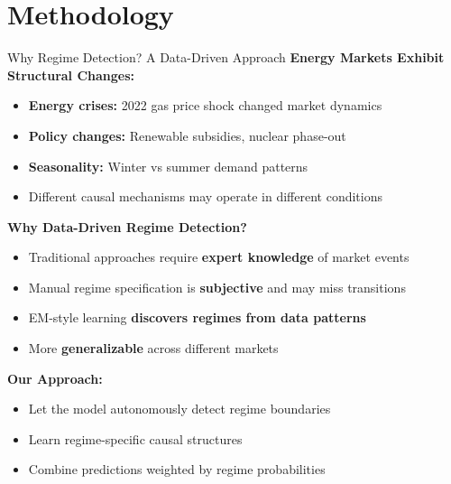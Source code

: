 \documentclass[aspectratio=169]{beamer}
\begin{document}
\section{Methodology}

\begin{frame}{Why Regime Detection? A Data-Driven Approach}
\textbf{Energy Markets Exhibit Structural Changes:}
\begin{itemize}
    \item \textbf{Energy crises:} 2022 gas price shock changed market dynamics
    \item \textbf{Policy changes:} Renewable subsidies, nuclear phase-out
    \item \textbf{Seasonality:} Winter vs summer demand patterns
    \item Different causal mechanisms may operate in different conditions
\end{itemize}

\vspace{0.3cm}
\textbf{Why Data-Driven Regime Detection?}
\begin{itemize}
    \item Traditional approaches require \textbf{expert knowledge} of market events
    \item Manual regime specification is \textbf{subjective} and may miss transitions
    \item EM-style learning \textbf{discovers regimes from data patterns}
    \item More \textbf{generalizable} across different markets
\end{itemize}

\vspace{0.3cm}
\textbf{Our Approach:}
\begin{itemize}
    \item Let the model autonomously detect regime boundaries
    \item Learn regime-specific causal structures
    \item Combine predictions weighted by regime probabilities
\end{itemize}
\end{frame}
\end{document}
